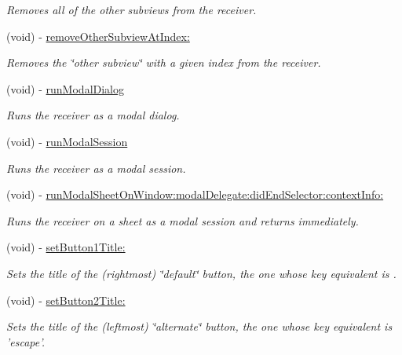 \begin{CompactItemize}
\begin{CompactList}\small\item\em Removes all of the {\em other subviews\/} from the receiver. \item\end{CompactList}\item 
(void) - \hyperlink{interface_s_s_y_alert_42a3e095cf9380845f1425ddab0ca00d}{removeOtherSubviewAtIndex:}
\begin{CompactList}\small\item\em Removes the \char`\"{}other subview\char`\"{} with a given index from the receiver. \item\end{CompactList}\item 
(void) - \hyperlink{interface_s_s_y_alert_0306aca65c1fb2d524ac8a83151cd067}{runModalDialog}
\begin{CompactList}\small\item\em Runs the receiver as a modal dialog. \item\end{CompactList}\item 
(void) - \hyperlink{interface_s_s_y_alert_635093dd5f073df822990abb2e00f45c}{runModalSession}
\begin{CompactList}\small\item\em Runs the receiver as a modal session. \item\end{CompactList}\item 
(void) - \hyperlink{interface_s_s_y_alert_1802c30942f4a728c4c5806ef7d0d9e5}{runModalSheetOnWindow:modalDelegate:didEndSelector:contextInfo:}
\begin{CompactList}\small\item\em Runs the receiver on a sheet as a modal session and returns immediately. \item\end{CompactList}\item 
(void) - \hyperlink{interface_s_s_y_alert_345913b14e1928b90356fdea34870286}{setButton1Title:}
\begin{CompactList}\small\item\em Sets the title of the (rightmost) \char`\"{}default\char`\"{} button, the one whose key equivalent is . \item\end{CompactList}\item 
(void) - \hyperlink{interface_s_s_y_alert_d21c7e11150433813919127326a49692}{setButton2Title:}
\begin{CompactList}\small\item\em Sets the title of the (leftmost) \char`\"{}alternate\char`\"{} button, the one whose key equivalent is 'escape'. \item\end{CompactList}\item 

\end{CompactItemize}
